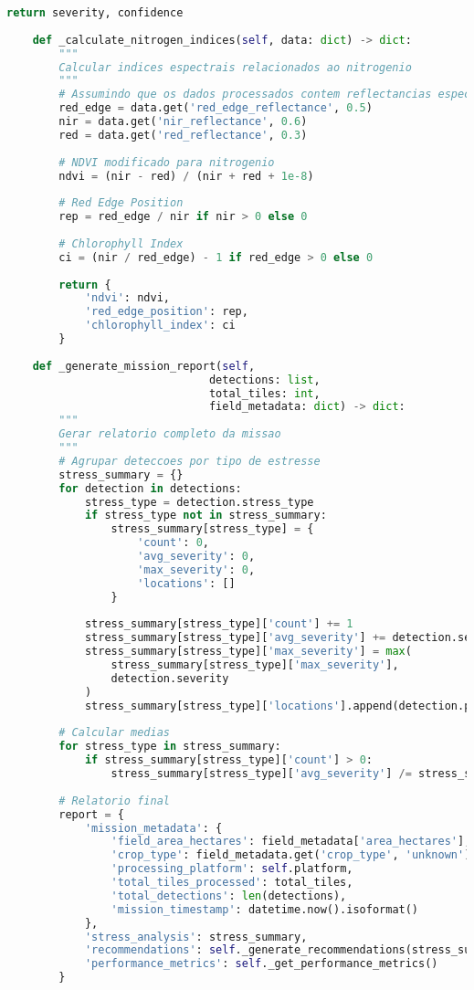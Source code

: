 \begin{lstlisting}[language=Python]
        return severity, confidence
    
    def _calculate_nitrogen_indices(self, data: dict) -> dict:
        """
        Calcular indices espectrais relacionados ao nitrogenio
        """
        # Assumindo que os dados processados contem reflectancias especificas
        red_edge = data.get('red_edge_reflectance', 0.5)
        nir = data.get('nir_reflectance', 0.6)
        red = data.get('red_reflectance', 0.3)
        
        # NDVI modificado para nitrogenio
        ndvi = (nir - red) / (nir + red + 1e-8)
        
        # Red Edge Position
        rep = red_edge / nir if nir > 0 else 0
        
        # Chlorophyll Index
        ci = (nir / red_edge) - 1 if red_edge > 0 else 0
        
        return {
            'ndvi': ndvi,
            'red_edge_position': rep,
            'chlorophyll_index': ci
        }
    
    def _generate_mission_report(self, 
                               detections: list,
                               total_tiles: int,
                               field_metadata: dict) -> dict:
        """
        Gerar relatorio completo da missao
        """
        # Agrupar deteccoes por tipo de estresse
        stress_summary = {}
        for detection in detections:
            stress_type = detection.stress_type
            if stress_type not in stress_summary:
                stress_summary[stress_type] = {
                    'count': 0,
                    'avg_severity': 0,
                    'max_severity': 0,
                    'locations': []
                }
            
            stress_summary[stress_type]['count'] += 1
            stress_summary[stress_type]['avg_severity'] += detection.severity
            stress_summary[stress_type]['max_severity'] = max(
                stress_summary[stress_type]['max_severity'], 
                detection.severity
            )
            stress_summary[stress_type]['locations'].append(detection.pixel_location)
        
        # Calcular medias
        for stress_type in stress_summary:
            if stress_summary[stress_type]['count'] > 0:
                stress_summary[stress_type]['avg_severity'] /= stress_summary[stress_type]['count']
        
        # Relatorio final
        report = {
            'mission_metadata': {
                'field_area_hectares': field_metadata['area_hectares'],
                'crop_type': field_metadata.get('crop_type', 'unknown'),
                'processing_platform': self.platform,
                'total_tiles_processed': total_tiles,
                'total_detections': len(detections),
                'mission_timestamp': datetime.now().isoformat()
            },
            'stress_analysis': stress_summary,
            'recommendations': self._generate_recommendations(stress_summary),
            'performance_metrics': self._get_performance_metrics()
        }
        

\end{lstlisting}
